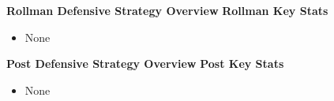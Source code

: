 \documentclass[a4paper,12pt]{article}
\begin{document}
\vspace{1em}

\noindent \textbf{Rollman Defensive Strategy Overview}
\hfill \textbf{Rollman Key Stats}
\begin{table}[H]
    \flushleft
    \hfill
    \begin{minipage}[c]{0.5\textwidth}
        {\small
        \begin{itemize}[rightmargin= 0em, label=\textbullet]
            \item None
        \end{itemize}
        }
    \end{minipage}
    
\end{table}

\vspace{1em}

\noindent \textbf{Post Defensive Strategy Overview}
\hfill \textbf{Post Key Stats}
\begin{table}[H]
    \flushleft
    \hfill
    \begin{minipage}[c]{0.5\textwidth}
        {\small
        \begin{itemize}[rightmargin= 0em, label=\textbullet]
            \item None
        \end{itemize}
        }
    \end{minipage}
    
\end{table}

\vspace{2em}

\end{document}

